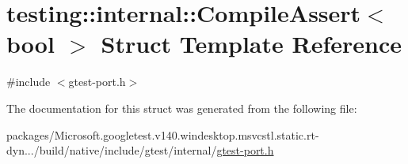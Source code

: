 \hypertarget{structtesting_1_1internal_1_1_compile_assert}{}\section{testing\+::internal\+::Compile\+Assert$<$ bool $>$ Struct Template Reference}
\label{structtesting_1_1internal_1_1_compile_assert}


{\ttfamily \#include $<$gtest-\/port.\+h$>$}



The documentation for this struct was generated from the following file\+:\begin{DoxyCompactItemize}
\item 
packages/\+Microsoft.\+googletest.\+v140.\+windesktop.\+msvcstl.\+static.\+rt-\/dyn.../build/native/include/gtest/internal/\mbox{\hyperlink{gtest-port_8h}{gtest-\/port.\+h}}\end{DoxyCompactItemize}
